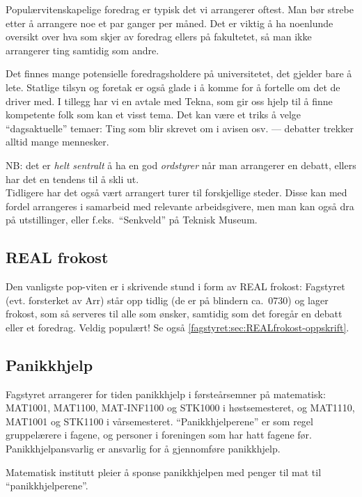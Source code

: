 Populærvitenskapelige foredrag er typisk det vi arrangerer oftest.
Man bør strebe etter å arrangere noe et par ganger per måned.
Det er viktig å ha noenlunde oversikt over hva som skjer av foredrag ellers
på fakultetet, så man ikke arrangerer ting samtidig som andre.

Det finnes mange potensielle foredragsholdere på universitetet, det gjelder bare
å lete.
Statlige tilsyn og foretak er også glade i å komme for å fortelle om det de
driver med.
I tillegg har vi en avtale med Tekna, som gir oss
hjelp til å finne kompetente folk som kan et visst tema. 
Det kan være et triks å velge ``dagsaktuelle'' temaer:
Ting som blir skrevet om i avisen osv. ---
debatter trekker alltid mange mennesker.

NB: det er \emph{helt sentralt} å ha en god \emph{ordstyrer} når man
arrangerer en debatt, ellers har det en tendens til å skli ut.\\

Tidligere har det også vært arrangert turer til forskjellige steder.
Disse kan med fordel arrangeres i samarbeid med relevante arbeidsgivere, 
men man kan også dra på utstillinger,
eller f.eks.~``Senkveld'' på Teknisk Museum.

\subsection{REAL frokost}
Den vanligste pop-viten er i skrivende stund i form av REAL frokost:
Fagstyret (evt. forsterket av Arr) står opp tidlig (de er på blindern
ca.~0730) og lager frokost, som så serveres til alle som ønsker, samtidig som
det foregår en debatt eller et foredrag.
Veldig populært!
Se også \ref{fagstyret:sec:REALfrokost-oppskrift}.

\subsection{Panikkhjelp}
Fagstyret arrangerer for tiden panikkhjelp i første\-års\-emner på matematisk:
MAT1001, MAT1100, MAT-INF1100 og STK1000 i høstsemesteret, og MAT1110, MAT1001
 og STK1100 i vårsemesteret. ``Panikkhjelperene'' er som regel gruppelærere i
fagene, og personer i foreningen som har hatt fagene før.
Panikkhjelpansvarlig er ansvarlig for å gjennomføre panikkhjelp.

Matematisk institutt pleier å sponse panikkhjelpen med penger til mat til
``panikkhjelperene''.

